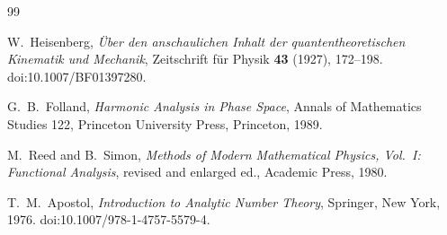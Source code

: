 \documentclass[11pt]{amsart}
\numberwithin{equation}{section}
\theoremstyle{plain}
\theoremstyle{definition}
\theoremstyle{remark}
\begin{document}
\begin{thebibliography}{99}

W.~Heisenberg,
\emph{\"Uber den anschaulichen Inhalt der quantentheoretischen Kinematik und
Mechanik},
Zeitschrift f\"ur Physik \textbf{43} (1927), 172--198.
doi:10.1007/BF01397280.

G.~B.~Folland,
\emph{Harmonic Analysis in Phase Space},
Annals of Mathematics Studies 122,
Princeton University Press, Princeton, 1989.

M.~Reed and B.~Simon,
\emph{Methods of Modern Mathematical Physics, Vol.~I: Functional Analysis},
revised and enlarged ed., Academic Press, 1980.

T.~M.~Apostol,
\emph{Introduction to Analytic Number Theory},
Springer, New York, 1976.
doi:10.1007/978-1-4757-5579-4.

\end{thebibliography}
\end{document}
